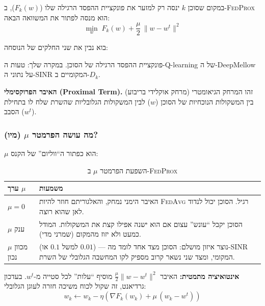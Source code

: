 \documentclass[11pt,a4paper]{article}
\newcommand{\FedAvg}{\textsc{FedAvg}}
\newcommand{\FedProx}{\textsc{FedProx}}
\begin{document}
במקום שסוכן $k$ ינסה רק למזער את פונקציית ההפסד הרגילה שלו ($F_k(w)$), ב-\FedProx{} הוא מנסה לפתור את המשוואה הבאה:
\begin{equation}
  \min_{w} \; F_k(w) + \frac{\mu}{2} \, \lVert w - w^t \rVert^2
  \label{eq:fedprox-objective}
\end{equation}

בוא נבין את שני החלקים של הנוסחה:

\begin{description}[style=nextline, leftmargin=3.2cm, labelwidth=3cm]
  \item[$F_k(w)$]
    פונקציית ההפסד הרגילה של הסוכן.
    במקרה שלך: טעות ה-Q-learning של ה-DeepMellow על נתוני ה-SINR המקומיים ב-$D_k$.

  \item[$\dfrac{\mu}{2} \lVert w - w^t \rVert^2$]
    \textbf{האיבר הפרוקסימלי (Proximal Term).}
    זהו המרחק הגיאומטרי (מרחק אוקלידי בריבוע) בין המשקולות הנוכחיות של הסוכן ($w$) לבין המשקולות הגלובליות שהשרת שלח לו בתחילת הסבב ($w^t$).
\end{description}

\subsubsection{מה עושה הפרמטר $\mu$ (מיו)?}

$\mu$ הוא כפתור ה``ווליום'' של הקנס:

\begin{table}[H]
  \centering
  \caption{השפעת הפרמטר $\mu$ ב-\FedProx}
  \label{tab:mu-effect}
  \begin{tabular}{@{}>{\raggedright\arraybackslash}p{2.2cm}>{\raggedright\arraybackslash}p{11.5cm}@{}}
    \toprule
    \textbf{ערך $\mu$} & \textbf{משמעות} \\
    \midrule
    $\mu = 0$ &
    האיבר הימני נמחק, והאלגוריתם חוזר להיות \FedAvg{} רגיל. הסוכן יכול לנדוד לאן שהוא רוצה. \\
    \addlinespace
    $\mu$ ענק &
    הסוכן יקבל ``עונש'' עצום אם הוא ישנה אפילו קצת את המשקולות. המודל כמעט ולא יזוז מהמקום (שמרני מדי). \\
    \addlinespace
    $\mu$ מכוון נכון &
    (למשל $0.1$ או $0.01$) --- נוצר איזון מושלם: הסוכן מצד אחד לומד מה-SINR המקומי, ומצד שני נשאר קרוב מספיק לקו המחשבה הגלובלי של השרת. \\
    \bottomrule
  \end{tabular}
\end{table}

\textbf{אינטואיציה מתמטית:} האיבר $\frac{\mu}{2}\lVert w - w^t \rVert^2$ מוסיף ``עלות'' לכל סטייה מ-$w^t$.
בעדכון גרדיאנט, זה שקול לכוח משיכה חזרה לעוגן הגלובלי:
\begin{equation}
  w_k \leftarrow w_k - \eta \left( \nabla F_k(w_k) + \mu \, (w_k - w^t) \right)
  \label{eq:fedprox-update}
\end{equation}
\end{document}
